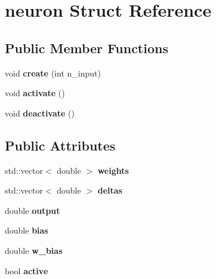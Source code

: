 \hypertarget{structneuron}{\section{neuron Struct Reference}
\label{structneuron}
}
\subsection*{Public Member Functions}
\begin{DoxyCompactItemize}
\item 
\hypertarget{structneuron_abbe656fe98d44f42741b9b3412c05187}{void {\bfseries create} (int n\-\_\-input)}\label{structneuron_abbe656fe98d44f42741b9b3412c05187}

\item 
\hypertarget{structneuron_a6751788971a339ccc522333f740ffd41}{void {\bfseries activate} ()}\label{structneuron_a6751788971a339ccc522333f740ffd41}

\item 
\hypertarget{structneuron_adbea299710f3a6402e83433b3c0cabf9}{void {\bfseries deactivate} ()}\label{structneuron_adbea299710f3a6402e83433b3c0cabf9}

\end{DoxyCompactItemize}
\subsection*{Public Attributes}
\begin{DoxyCompactItemize}
\item 
\hypertarget{structneuron_a46dd6f29c430390f623f708e12fdf333}{std\-::vector$<$ double $>$ {\bfseries weights}}\label{structneuron_a46dd6f29c430390f623f708e12fdf333}

\item 
\hypertarget{structneuron_adbb698db478b03d1df7da41d977a8690}{std\-::vector$<$ double $>$ {\bfseries deltas}}\label{structneuron_adbb698db478b03d1df7da41d977a8690}

\item 
\hypertarget{structneuron_ae47a1f9995c0649c2d5811692c1d294f}{double {\bfseries output}}\label{structneuron_ae47a1f9995c0649c2d5811692c1d294f}

\item 
\hypertarget{structneuron_a9ab850dc68643bc01d84c6bbef9640a9}{double {\bfseries bias}}\label{structneuron_a9ab850dc68643bc01d84c6bbef9640a9}

\item 
\hypertarget{structneuron_a02ae7cb21e0edaf78e96b687ae10c2b6}{double {\bfseries w\-\_\-bias}}\label{structneuron_a02ae7cb21e0edaf78e96b687ae10c2b6}

\item 
\hypertarget{structneuron_a23ae47a4501a58d5f9ac6b5d37622e9a}{bool {\bfseries active}}\label{structneuron_a23ae47a4501a58d5f9ac6b5d37622e9a}

\end{DoxyCompactItemize}


